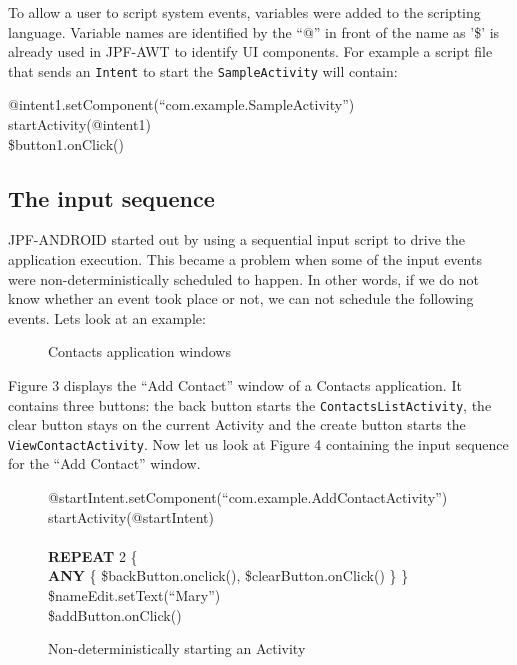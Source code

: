 \documentclass{acm_proc_article-sp}
\begin{document}
To allow a user to script system events, variables were added to the scripting language. Variable names are identified by
the ``@'' in front of the name as '\$' is already used in JPF-AWT to identify UI components. For example a script file that sends an
\texttt{Intent} to start the \texttt{SampleActivity} will contain:

{\small
{\sf
\hspace*{4mm}@intent1.setComponent(``com.example.SampleActivity'')\\
\hspace*{4mm}startActivity(@intent1)\\
\hspace*{4mm}\$button1.onClick()

}
}

\subsection{The input sequence}
JPF-ANDROID started out by using a sequential input script to drive the application execution. This became a problem when some of the
input events were non-deterministically scheduled to happen. In other words, if we do not know whether an event took place or
not, we can not schedule the following events. Lets look at an example:

\begin{figure}
\centering
{}
\caption{Contacts application windows}
\end{figure}

Figure 3 displays the ``Add Contact'' window of a Contacts application. It contains three
buttons: the back button starts the \texttt{ContactsListActivity}, the clear button stays on the current Activity and the create 
button starts the \texttt{ViewContactActivity}. Now let us look at Figure 4 containing the input sequence for the ``Add Contact'' window.

\begin{figure}
{\small
{\sf 
@startIntent.setComponent(``com.example.AddContactActivity'')\\
startActivity(@startIntent)\\
\\
\textbf{REPEAT} 2 \{\\
\hspace*{2mm}\textbf{ANY} \{ \$backButton.onclick(), \$clearButton.onClick()  \}
\}\\
\$nameEdit.setText(``Mary'')\\
\$addButton.onClick() 
}
}
\caption{Non-deterministically starting an Activity}
\end{figure}
\end{document}
